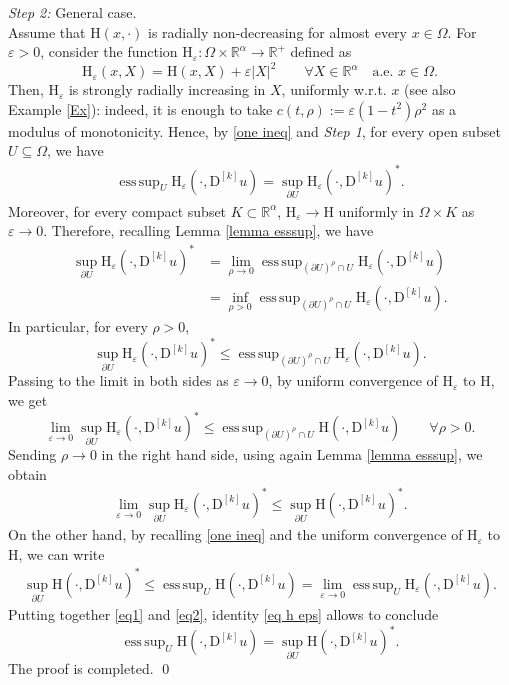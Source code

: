 \documentclass[a4paper,11pt]{article}
\numberwithin{equation}{section}
\newcommand{\numberset}{\mathbb}
\newcommand{\eps}{\varepsilon}
\newcommand{\Om}{\Omega}
\newcommand{\R}{\numberset{R}}
\newcommand{\rom}{\mathrm}
\DeclareMathOperator*{\esssup}{ess\,sup}
\theoremstyle{definition}
\begin{document}
\noindent
\textit{Step 2:} General case.\\
Assume that $\rom{H}(x,\cdot)$ is radially non-decreasing for almost every $x\in\Om$. For $\eps>0$, consider the function $\rom{H}_\eps:\Om\times\R^\alpha\to\R^+$ defined as
$$
\rom{H}_\eps(x,X)=\rom{H}(x,X)+\eps|X|^2 \qquad\forall X\in\R^\alpha\quad\mbox{a.e. }x\in\Om.
$$
Then, $\rom{H}_\eps$ is strongly radially increasing in $X$, uniformly w.r.t. $x$ (see also Example \ref{Ex}): indeed, it is enough to take $c(t,\rho):=\eps(1-t^2)\rho^2$ as a modulus of monotonicity. Hence, by \eqref{one ineq} and \textit{Step 1}, for every open subset $U\subseteq\Om$, we have
\begin{align}\label{eq h eps}
\esssup_U \rom{H}_\eps(\cdot, \mathrm D ^{[k]}u)=\sup_{\partial U}\rom{H}_\eps(\cdot,\mathrm D ^{[k]}u)^*.
\end{align}
Moreover, for every compact subset $K\subset\R^\alpha$, $\rom{H}_\eps\to \rom{H}$ uniformly in $\Om\times K$ as $\eps\to 0$. Therefore, recalling Lemma \eqref{lemma esssup}, we have
\begin{align*}
\sup_{\partial U}\rom{H}_\eps(\cdot,\mathrm D ^{[k]}u)^*&=\lim_{\rho\to0}\esssup_{(\partial U)^\rho\cap U}\rom{H}_\eps(\cdot, \mathrm D ^{[k]}u)\\
&= \inf_{\rho>0}\esssup_{(\partial U)^\rho\cap U}\rom{H}_\eps(\cdot, \mathrm D ^{[k]}u).
\end{align*}
In particular, for every $\rho>0$,
$$
\sup_{\partial U}\rom{H}_\eps(\cdot,\mathrm D ^{[k]}u)^*\leq \esssup_{(\partial U)^\rho\cap U}\rom{H}_\eps(\cdot, \mathrm D ^{[k]}u).
$$
Passing to the limit in both sides as $\eps\to 0$, by uniform convergence of $\rom{H}_\eps$ to $\rom{H}$, we get
$$
\lim_{\eps\to0}\sup_{\partial U}\rom{H}_\eps(\cdot,\mathrm D ^{[k]}u)^*\leq\esssup_{(\partial U)^\rho\cap U}\rom{H}(\cdot, \mathrm D ^{[k]}u)\qquad\forall \rho>0.
$$
Sending $\rho\to0$ in the right hand side, using again Lemma \eqref{lemma esssup}, we obtain
\begin{align}\label{eq1}
\lim_{\eps\to0}\sup_{\partial U}\rom{H}_\eps(\cdot,\mathrm D ^{[k]}u)^*\leq\sup_{\partial U}\rom{H}(\cdot,\mathrm D ^{[k]}u)^*.
\end{align}
On the other hand, by recalling \eqref{one ineq} and the uniform convergence of $\rom{H}_\eps$ to $\rom{H}$, we can write
\begin{align}\label{eq2}
\sup_{\partial U}\rom{H}(\cdot,\mathrm D ^{[k]}u)^*\leq\esssup_U \rom{H}(\cdot, \mathrm D ^{[k]}u)=\lim_{\eps\to0}\esssup_U \rom{H}_\eps(\cdot, \mathrm D ^{[k]}u).
\end{align}
Putting together \eqref{eq1} and \eqref{eq2}, identity \eqref{eq h eps} allows to conclude
$$
\esssup_U \rom{H}(\cdot, \mathrm D ^{[k]}u)=\sup_{\partial U}\rom{H}(\cdot,\mathrm D ^{[k]}u)^*.
$$
The proof is completed. \qed
\\
\end{document}
